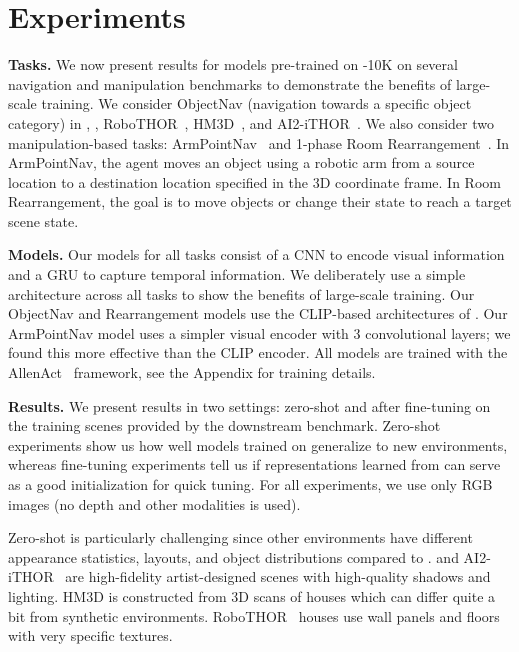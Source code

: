 \section{Experiments}
\label{sec:experiments}

\noindent \textbf{Tasks.}
We now present results for models pre-trained on \env{}-10K on several navigation and manipulation benchmarks to demonstrate the benefits of large-scale training. We consider ObjectNav (navigation towards a specific object category) in \env{}, \elienv{}, RoboTHOR~\cite{Deitke2020RoboTHORAO}, HM3D~\cite{Ramakrishnan2021HabitatMatterport3D}, and AI2-iTHOR~\cite{kolve2017ai2}. We also consider two manipulation-based tasks: ArmPointNav~\cite{manipulathor} and 1-phase Room Rearrangement~\cite{weihs2021visual}. In ArmPointNav, the agent moves an object using a robotic arm from a source location to a destination location specified in the 3D coordinate frame. In Room Rearrangement, the goal is to move objects or change their state to reach a target scene state.

\noindent \textbf{Models.}
Our models for all tasks consist of a CNN to encode visual information and a GRU to capture temporal information. We deliberately use a simple architecture across all tasks to show the benefits of large-scale training. Our ObjectNav and Rearrangement models use the CLIP-based architectures of \cite{khandelwal2021simple}. Our ArmPointNav model uses a simpler visual encoder with 3 convolutional layers; we found this more effective than the CLIP encoder. All models are trained with the AllenAct~\cite{weihs2020allenact} framework, see the Appendix for training details.


\noindent \textbf{Results.}
\label{sec:results}
We present results in two settings: zero-shot and after fine-tuning on the training scenes provided by the downstream benchmark. Zero-shot experiments show us how well models trained on \env generalize to new environments, whereas fine-tuning experiments tell us if representations learned from \env can serve as a good initialization for quick tuning. For all experiments, we use only RGB images (no depth and other modalities is used). 

Zero-shot is particularly challenging since other environments have different appearance statistics, layouts, and object distributions compared to \env{}. \elienv{} and AI2-iTHOR~\cite{kolve2017ai2} are high-fidelity artist-designed scenes with high-quality shadows and lighting. HM3D is constructed from 3D scans of houses which can differ quite a bit from synthetic environments. RoboTHOR~\cite{Deitke2020RoboTHORAO} houses use wall panels and floors with very specific textures.


